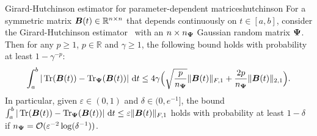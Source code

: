 \begin{theorem}{Girard-Hutchinson estimator for parameter-dependent matrices}{hutchinson}
For a symmetric matrix $\boldsymbol{B}(t) \in \mathbb{R}^{n \times n}$ that depends continuously on $t \in [a, b]$, consider the  Girard-Hutchinson estimator~ with an $n\times n_{\boldsymbol{\Psi}}$ Gaussian random matrix $\boldsymbol{\Psi}$. Then for any $p \geq 1$, $p \in \mathbb{R}$ and $\gamma \geq 1$, the following bound holds with probability at least $1 - \gamma^{-p}$:
\begin{equation}
    \int_{a}^{b} |\operatorname{Tr}(\boldsymbol{B}(t)) - \operatorname{Tr}_{\boldsymbol{\Psi}}(\boldsymbol{B}(t))|~\mathrm{d}t \leq 4 \gamma \Big( \sqrt{\frac{p}{n_{\boldsymbol{\Psi}}}}  \|\boldsymbol{B}(t)\|_{F,1} + \frac{2 p}{n_{\boldsymbol{\Psi}}} \|\boldsymbol{B}(t)\|_{2,1} \Big).
    \label{equ:girard-hutchinson-bound}
\end{equation}
In particular, given $\varepsilon \in (0, 1)$ and $\delta \in (0, e^{-1}]$, the bound $\int_{a}^{b} | \operatorname{Tr}(\boldsymbol{B}(t)) - \operatorname{Tr}_{\boldsymbol{\Psi}}(\boldsymbol{B}(t)) | ~\mathrm{d}t \leq \varepsilon \|\boldsymbol{B}(t)\|_{F,1}$ holds 
    with probability at least $1-\delta$ if $n_{\boldsymbol{\Psi}} = \mathcal{O}(\varepsilon^{-2} \log(\delta^{-1}))$.
\end{theorem}
